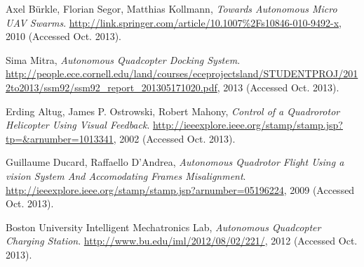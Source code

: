  Axel Bürkle, Florian Segor, Matthias Kollmann,
  \emph{Towards Autonomous Micro UAV Swarms}.
  \url{http://link.springer.com/article/10.1007%2Fs10846-010-9492-x},
  2010 (Accessed Oct. 2013).

  Sima Mitra,
  \emph{Autonomous Quadcopter Docking System}.
  \url{http://people.ece.cornell.edu/land/courses/eceprojectsland/STUDENTPROJ/2012to2013/ssm92/ssm92_report_201305171020.pdf},
   2013 (Accessed Oct. 2013).

  Erding Altug, James P. Ostrowski, Robert Mahony,
  \emph{Control of a Quadrorotor Helicopter Using Visual Feedback}.
  \url{http://ieeexplore.ieee.org/stamp/stamp.jsp?tp=&arnumber=1013341},
   2002 (Accessed Oct. 2013).

  Guillaume Ducard, Raffaello D'Andrea,
  \emph{Autonomous Quadrotor Flight Using a vision System And Accomodating Frames Misalignment}.
  \url{http://ieeexplore.ieee.org/stamp/stamp.jsp?arnumber=05196224},
   2009 (Accessed Oct. 2013).

  Boston University Intelligent Mechatronics Lab, 
  \emph{Autonomous Quadcopter Charging Station}.
  \url{http://www.bu.edu/iml/2012/08/02/221/}, 
  2012 (Accessed Oct. 2013).